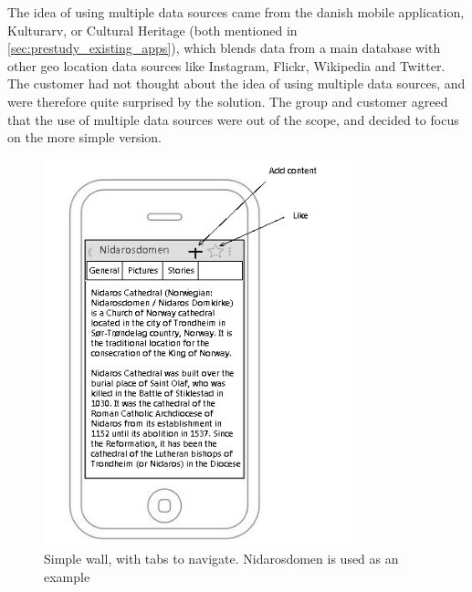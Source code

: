 \documentclass[11pt]{book}
\begin{document}
The idea of using multiple data sources came from the danish mobile application, Kulturarv, or Cultural Heritage (both mentioned in \ref{sec:prestudy_existing_apps}), which blends data from a main database with other geo location data sources like Instagram, Flickr, Wikipedia and Twitter. The customer had not thought about the idea of using multiple data sources, and were therefore quite surprised by the solution. The group and customer agreed that the use of multiple data sources were out of the scope, and decided to focus on the more simple version.

\begin{figure}[H]
    \centering
    \includegraphics[width=0.8\textwidth]{Figures/Phases/Sprint1/versiononeSimpleWall.png}
    \caption{Simple wall, with tabs to navigate. Nidarosdomen is used as an example}
    \label{fig:phases_sprint1_uiVersionOneSimpleWall}
\end{figure}
\end{document}
